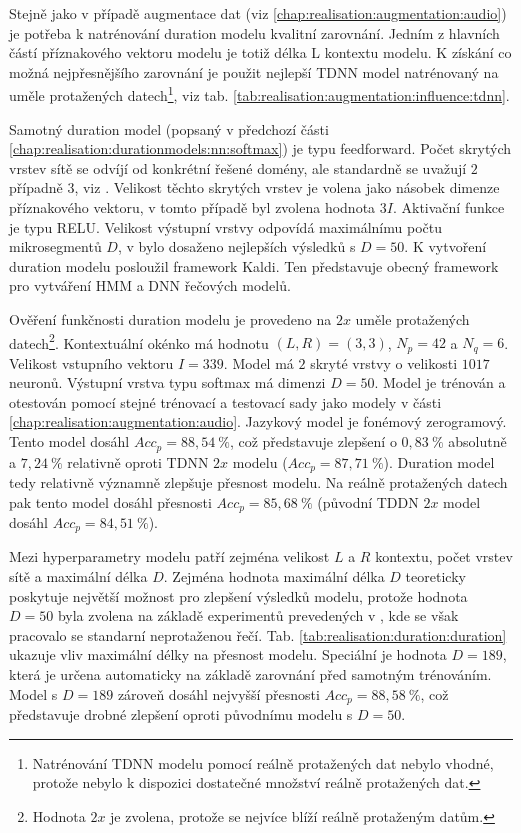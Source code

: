 Stejně jako v případě augmentace dat (viz \ref{chap:realisation:augmentation:audio}) je potřeba k natrénování duration modelu kvalitní zarovnání. Jedním z hlavních částí příznakového vektoru modelu je totiž délka L kontextu modelu. K získání co možná nejpřesnějšího zarovnání je použit nejlepší TDNN model natrénovaný na uměle protažených datech\footnote{Natrénování TDNN modelu pomocí reálně protažených dat nebylo vhodné, protože nebylo k dispozici dostatečné množství reálně protažených dat.}, viz tab. \ref{tab:realisation:augmentation:influence:tdnn}.

Samotný duration model (popsaný v předchozí části \ref{chap:realisation:durationmodels:nn:softmax}) je typu feedforward.  Počet skrytých vrstev sítě se odvíjí od konkrétní řešené domény, ale standardně se uvažují $2$ případně $3$, viz \cite{Hadian2017}. Velikost těchto skrytých vrstev je volena jako násobek dimenze příznakového vektoru, v tomto případě byl zvolena hodnota $3I$. Aktivační funkce je typu RELU. Velikost výstupní vrstvy odpovídá maximálnímu počtu mikrosegmentů $D$, v \cite{Hadian2017} bylo dosaženo nejlepších výsledků s $D=50$. K vytvoření duration modelu posloužil framework Kaldi. Ten představuje obecný framework pro vytváření HMM a DNN řečových modelů.

Ověření funkčnosti duration modelu je provedeno na $2x$ uměle protažených datech\footnote{Hodnota $2x$ je zvolena, protože se nejvíce blíží reálně protaženým datům.}. Kontextuální okénko má hodnotu $\left(L, R\right) = \left(3, 3\right)$, $N_{p} = 42$ a $N_{q} = 6$. Velikost vstupního vektoru $I = 339$. Model má $2$ skryté vrstvy o velikosti $1017$ neuronů. Výstupní vrstva typu softmax má dimenzi $D=50$. Model je trénován a otestován pomocí stejné trénovací a testovací sady jako modely v části \ref{chap:realisation:augmentation:audio}. Jazykový model je fonémový zerogramový. Tento model dosáhl $Acc_{p} = 88,54\ \%$, což představuje zlepšení o $0,83\ \%$ absolutně a $7,24\ \%$ relativně oproti TDNN $2x$ modelu ($Acc_{p} = 87,71\ \%$). Duration model tedy relativně významně zlepšuje přesnost modelu. Na reálně protažených datech pak tento model dosáhl přesnosti $Acc_{p} = 85,68\ \%$ (původní TDDN $2x$ model dosáhl $Acc_{p} = 84,51\ \%$).

Mezi hyperparametry modelu patří zejména velikost $L$ a $R$ kontextu, počet vrstev sítě a maximální délka $D$. Zejména hodnota maximální délka $D$ teoreticky poskytuje největší možnost pro zlepšení výsledků modelu, protože hodnota $D=50$ byla zvolena na základě experimentů prevedených v \cite{Hadian2017}, kde se však pracovalo se standarní neprotaženou řečí. Tab. \ref{tab:realisation:duration:duration} ukazuje vliv maximální délky na přesnost modelu. Speciální je hodnota $D=189$, která je určena automaticky na základě zarovnání před samotným trénováním. Model s $D=189$ zároveň dosáhl nejvyšší přesnosti $Acc_{p} = 88,58\ \%$, což představuje drobné zlepšení oproti původnímu modelu s $D = 50$.

